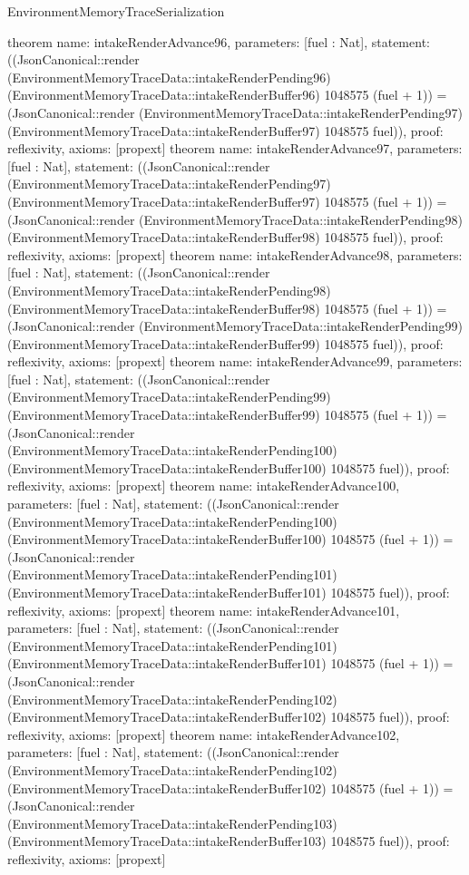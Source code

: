 \begin{lexlean}{EnvironmentMemoryTraceSerialization}
\begin{semanticmodule}
{}
theorem{
 name: intakeRenderAdvance96, parameters: [fuel : Nat],
 statement: ((JsonCanonical::render (EnvironmentMemoryTraceData::intakeRenderPending96) (EnvironmentMemoryTraceData::intakeRenderBuffer96) 1048575 (fuel + 1)) = (JsonCanonical::render (EnvironmentMemoryTraceData::intakeRenderPending97) (EnvironmentMemoryTraceData::intakeRenderBuffer97) 1048575 fuel)), proof: reflexivity{}, axioms: [propext]
}
theorem{
 name: intakeRenderAdvance97, parameters: [fuel : Nat],
 statement: ((JsonCanonical::render (EnvironmentMemoryTraceData::intakeRenderPending97) (EnvironmentMemoryTraceData::intakeRenderBuffer97) 1048575 (fuel + 1)) = (JsonCanonical::render (EnvironmentMemoryTraceData::intakeRenderPending98) (EnvironmentMemoryTraceData::intakeRenderBuffer98) 1048575 fuel)), proof: reflexivity{}, axioms: [propext]
}
theorem{
 name: intakeRenderAdvance98, parameters: [fuel : Nat],
 statement: ((JsonCanonical::render (EnvironmentMemoryTraceData::intakeRenderPending98) (EnvironmentMemoryTraceData::intakeRenderBuffer98) 1048575 (fuel + 1)) = (JsonCanonical::render (EnvironmentMemoryTraceData::intakeRenderPending99) (EnvironmentMemoryTraceData::intakeRenderBuffer99) 1048575 fuel)), proof: reflexivity{}, axioms: [propext]
}
theorem{
 name: intakeRenderAdvance99, parameters: [fuel : Nat],
 statement: ((JsonCanonical::render (EnvironmentMemoryTraceData::intakeRenderPending99) (EnvironmentMemoryTraceData::intakeRenderBuffer99) 1048575 (fuel + 1)) = (JsonCanonical::render (EnvironmentMemoryTraceData::intakeRenderPending100) (EnvironmentMemoryTraceData::intakeRenderBuffer100) 1048575 fuel)), proof: reflexivity{}, axioms: [propext]
}
theorem{
 name: intakeRenderAdvance100, parameters: [fuel : Nat],
 statement: ((JsonCanonical::render (EnvironmentMemoryTraceData::intakeRenderPending100) (EnvironmentMemoryTraceData::intakeRenderBuffer100) 1048575 (fuel + 1)) = (JsonCanonical::render (EnvironmentMemoryTraceData::intakeRenderPending101) (EnvironmentMemoryTraceData::intakeRenderBuffer101) 1048575 fuel)), proof: reflexivity{}, axioms: [propext]
}
theorem{
 name: intakeRenderAdvance101, parameters: [fuel : Nat],
 statement: ((JsonCanonical::render (EnvironmentMemoryTraceData::intakeRenderPending101) (EnvironmentMemoryTraceData::intakeRenderBuffer101) 1048575 (fuel + 1)) = (JsonCanonical::render (EnvironmentMemoryTraceData::intakeRenderPending102) (EnvironmentMemoryTraceData::intakeRenderBuffer102) 1048575 fuel)), proof: reflexivity{}, axioms: [propext]
}
theorem{
 name: intakeRenderAdvance102, parameters: [fuel : Nat],
 statement: ((JsonCanonical::render (EnvironmentMemoryTraceData::intakeRenderPending102) (EnvironmentMemoryTraceData::intakeRenderBuffer102) 1048575 (fuel + 1)) = (JsonCanonical::render (EnvironmentMemoryTraceData::intakeRenderPending103) (EnvironmentMemoryTraceData::intakeRenderBuffer103) 1048575 fuel)), proof: reflexivity{}, axioms: [propext]
}
\end{semanticmodule}
\end{lexlean}
